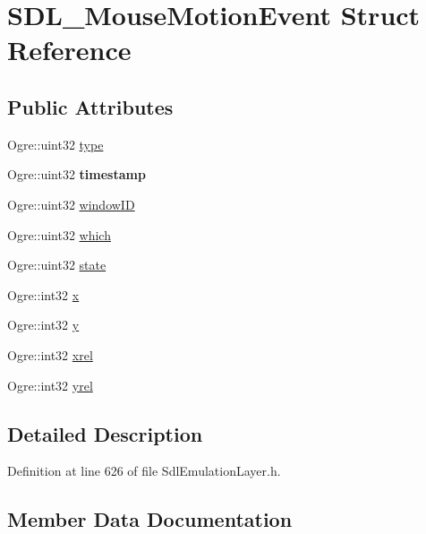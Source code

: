 \hypertarget{struct_s_d_l___mouse_motion_event}{}\section{S\+D\+L\+\_\+\+Mouse\+Motion\+Event Struct Reference}
\label{struct_s_d_l___mouse_motion_event}
\subsection*{Public Attributes}
\begin{DoxyCompactItemize}
\item 
Ogre\+::uint32 \hyperlink{struct_s_d_l___mouse_motion_event_ac30d623604135636e379662a8ea115d7}{type}
\item 
\mbox{\label{struct_s_d_l___mouse_motion_event_ade9bf8f0c9e162fc861b042661605783}} 
Ogre\+::uint32 {\bfseries timestamp}
\item 
Ogre\+::uint32 \hyperlink{struct_s_d_l___mouse_motion_event_ab56f333f28371a1a2ffcd160e0c87300}{window\+ID}
\item 
Ogre\+::uint32 \hyperlink{struct_s_d_l___mouse_motion_event_aba74dc264ec2e1617a5e20a5bbd6c097}{which}
\item 
Ogre\+::uint32 \hyperlink{struct_s_d_l___mouse_motion_event_a46f6986f4887a932f6e5fc0318e757df}{state}
\item 
Ogre\+::int32 \hyperlink{struct_s_d_l___mouse_motion_event_afb63357ab79b97c5177f698f98361bd5}{x}
\item 
Ogre\+::int32 \hyperlink{struct_s_d_l___mouse_motion_event_a5ec63d6686b27a2feb8f95073e4a4ad2}{y}
\item 
Ogre\+::int32 \hyperlink{struct_s_d_l___mouse_motion_event_a09f6ff4e8be12239421d5d2d279cb5f1}{xrel}
\item 
Ogre\+::int32 \hyperlink{struct_s_d_l___mouse_motion_event_a3e0fa5c6ad5bf75518caff81f984aed3}{yrel}
\end{DoxyCompactItemize}


\subsection{Detailed Description}


Definition at line 626 of file Sdl\+Emulation\+Layer.\+h.



\subsection{Member Data Documentation}
\mbox{\label{struct_s_d_l___mouse_motion_event_a46f6986f4887a932f6e5fc0318e757df}} 
